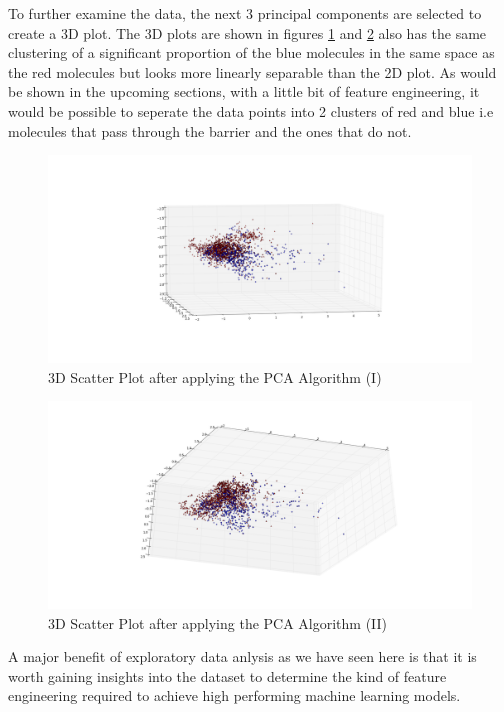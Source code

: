 \documentclass[a4paper,12pt]{report}
\begin{document}
		To further examine the data, the next 3 principal components are selected to create a 3D plot. The 3D plots are shown in figures \ref{fig:scatter_pca_3D} and \ref{fig:scatter_pca_3D_2} also has the same clustering of a significant proportion of the blue molecules in the same space as the red molecules but looks more linearly separable than the 2D plot. As would be shown in the upcoming sections, with a little bit of feature engineering, it would be possible to seperate the data points into 2 clusters of red and blue i.e molecules that pass through the barrier and the ones that do not. 
		\begin{figure}[H]
			\centering
			\includegraphics[width=\textwidth,scale=1,totalheight=0.4\textheight]{images/scatter_pca_3D}
			\caption{3D Scatter Plot after applying the PCA Algorithm (I)}
			\label{fig:scatter_pca_3D}
		\end{figure}
		\begin{figure}[H]
			\centering
			\includegraphics[width=\textwidth,scale=1,totalheight=0.4\textheight]{images/scatter_pca_3D_2}
			\caption{3D Scatter Plot after applying the PCA Algorithm (II)}
			\label{fig:scatter_pca_3D_2}
		\end{figure}
		
		A major benefit of exploratory data anlysis as we have seen here is that it is worth gaining insights into the dataset to determine the kind of feature engineering required to achieve high performing machine learning models.
	
\end{document}
